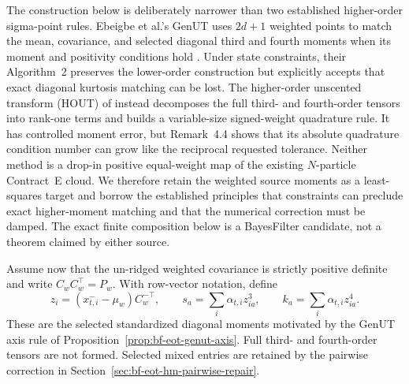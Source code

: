 The construction below is deliberately narrower than two established
higher-order sigma-point rules.  Ebeigbe et al.'s GenUT uses \(2d+1\) weighted
points to match the mean, covariance, and selected diagonal third and fourth
moments when its moment and positivity conditions hold
\citep[Secs.~III--V, Algorithms~1--2]{ebeigbe2025genut}.  Under state
constraints, their Algorithm~2 preserves the lower-order construction but
explicitly accepts that exact diagonal kurtosis matching can be lost.  The
higher-order unscented transform (HOUT) of
\citet[Definition~4.1, Theorem~4.2, Algorithm~4.1]{easley2021higherorder}
instead decomposes the full third- and fourth-order tensors into rank-one terms
and builds a variable-size signed-weight quadrature rule.  It has controlled
moment error, but Remark~4.4 shows that its absolute quadrature condition
number can grow like the reciprocal requested tolerance.  Neither method is a
drop-in positive equal-weight map of the existing \(N\)-particle Contract~E
cloud.  We therefore retain the weighted source moments as a least-squares
target and borrow the established principles that constraints can preclude
exact higher-moment matching and that the numerical correction must be damped.
The exact finite composition below is a BayesFilter candidate, not a theorem
claimed by either source.

Assume now that the un-ridged weighted covariance is strictly positive
definite and write \(C_wC_w^\top=P_w\).  With row-vector notation, define
\begin{equation}
 z_i=(x_{t,i}^{-}-\mu_w)C_w^{-\top},
 \qquad
 s_a=\sum_i\alpha_{t,i}z_{ia}^3,
 \qquad
 k_a=\sum_i\alpha_{t,i}z_{ia}^4.
 \label{eq:bf-eot-hm-target-moments}
\end{equation}
These are the selected standardized diagonal moments motivated by the GenUT
axis rule of Proposition~\ref{prop:bf-eot-genut-axis}.  Full third- and
fourth-order tensors are not formed.  Selected mixed entries are retained by
the pairwise correction in Section~\ref{sec:bf-eot-hm-pairwise-repair}.

